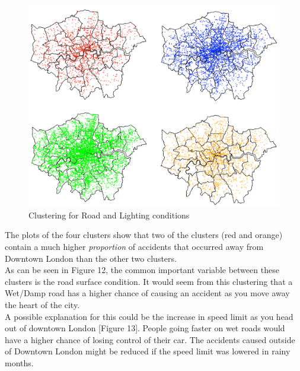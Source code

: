 \documentclass{neu_handout}
\begin{document}
\begin{figure}[!htb]
    \begin{center}
      \includegraphics[height=9cm, scale=0.01,keepaspectratio]{4_clusters.png}
      \caption{Clustering for Road and Lighting conditions}
    \end{center}
\end{figure}

The plots of the four clusters show that two of the clusters (red and orange) contain a much higher \textit{proportion} of accidents that occurred away from Downtown London than the other two clusters. \\


As can be seen in Figure 12, the common important variable between these clusters is the road surface condition. It would seem from this clustering that a Wet/Damp road has a higher chance of causing an accident as you move away the heart of the city. \\ 

A possible explanation for this could be the increase in speed limit as you head out of downtown London [Figure 13]. People going faster on wet roads would have a higher chance of losing control of their car. The accidents caused outside of Downtown London might be reduced if the speed limit was lowered in rainy months. \\
\end{document}
